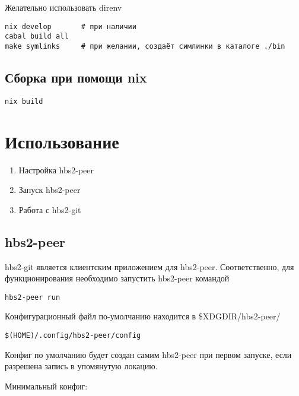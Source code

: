 \documentclass[11pt,a4paper]{article}
\begin{document}
Желательно использовать direnv

\begin{verbatim}
nix develop       # при наличии
cabal build all
make symlinks     # при желании, создаёт симлинки в каталоге ./bin
\end{verbatim}

\subsection{Сборка при помощи nix}

\begin{verbatim}
nix build
\end{verbatim}

\section{Использование}

\begin{enumerate}
  \item Настройка hbs2-peer
  \item Запуск hbs2-peer
  \item Работа с hbs2-git
\end{enumerate}

\subsection{hbs2-peer}

hbs2-git является клиентским приложением для hbs2-peer.
Соответственно, для функционирования необходимо запустить hbs2-peer командой

\begin{verbatim}
hbs2-peer run
\end{verbatim}

Конфигурационный файл по-умолчанию находится в \$XDGDIR/hbs2-peer/

\begin{verbatim}
$(HOME)/.config/hbs2-peer/config
\end{verbatim}

Конфиг по умолчанию будет создан самим hbs2-peer при первом запуске,
если разрешена запись в упомянутую локацию.

Минимальный конфиг:
\end{document}
